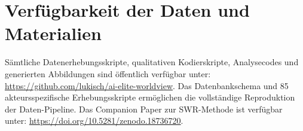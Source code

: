 \documentclass[12pt,a4paper]{article}
\begin{document}
\section*{Verf\"ugbarkeit der Daten und Materialien}

\noindent S\"amtliche Datenerhebungsskripte, qualitativen Kodierskripte, Analysecodes und generierten Abbildungen sind \"offentlich verf\"ugbar unter: \url{https://github.com/lukisch/ai-elite-worldview}. Das Datenbankschema und 85 akteursspezifische Erhebungsskripte erm\"oglichen die vollst\"andige Reproduktion der Daten-Pipeline. Das Companion Paper zur SWR-Methode ist verf\"ugbar unter: \url{https://doi.org/10.5281/zenodo.18736720}.

\newpage
\end{document}
